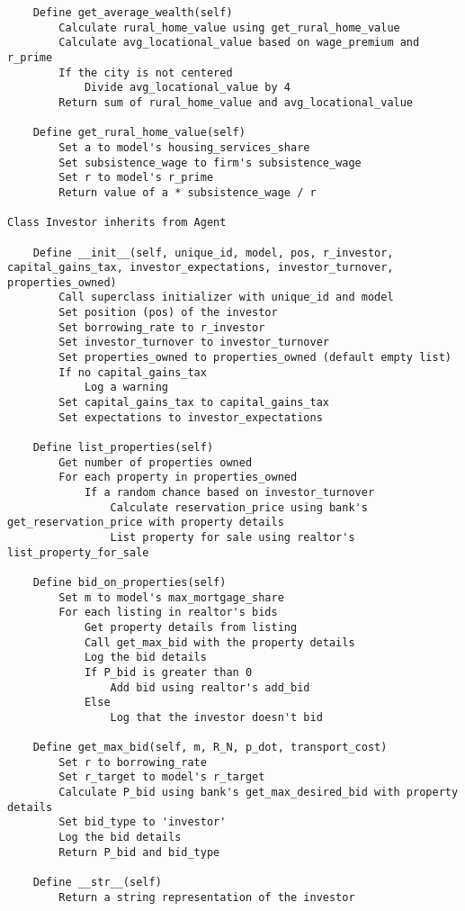 {\begin{verbatim}
    Define get_average_wealth(self)
        Calculate rural_home_value using get_rural_home_value
        Calculate avg_locational_value based on wage_premium and r_prime
        If the city is not centered
            Divide avg_locational_value by 4
        Return sum of rural_home_value and avg_locational_value

    Define get_rural_home_value(self)
        Set a to model's housing_services_share
        Set subsistence_wage to firm's subsistence_wage
        Set r to model's r_prime
        Return value of a * subsistence_wage / r

Class Investor inherits from Agent

    Define __init__(self, unique_id, model, pos, r_investor, capital_gains_tax, investor_expectations, investor_turnover, properties_owned)
        Call superclass initializer with unique_id and model
        Set position (pos) of the investor
        Set borrowing_rate to r_investor
        Set investor_turnover to investor_turnover
        Set properties_owned to properties_owned (default empty list)
        If no capital_gains_tax
            Log a warning
        Set capital_gains_tax to capital_gains_tax
        Set expectations to investor_expectations

    Define list_properties(self)
        Get number of properties owned
        For each property in properties_owned
            If a random chance based on investor_turnover
                Calculate reservation_price using bank's get_reservation_price with property details
                List property for sale using realtor's list_property_for_sale

    Define bid_on_properties(self)
        Set m to model's max_mortgage_share
        For each listing in realtor's bids
            Get property details from listing
            Call get_max_bid with the property details
            Log the bid details
            If P_bid is greater than 0
                Add bid using realtor's add_bid
            Else
                Log that the investor doesn't bid

    Define get_max_bid(self, m, R_N, p_dot, transport_cost)
        Set r to borrowing_rate
        Set r_target to model's r_target
        Calculate P_bid using bank's get_max_desired_bid with property details
        Set bid_type to 'investor'
        Log the bid details
        Return P_bid and bid_type

    Define __str__(self)
        Return a string representation of the investor


\end{verbatim}}
